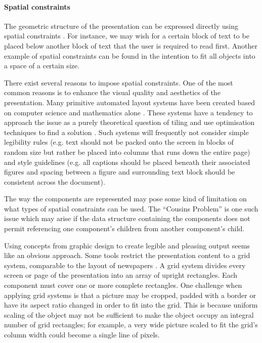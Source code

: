      \paragraph{Spatial constraints}
      \label{spatialcon}

      The geometric structure of the presentation can be expressed directly
      using spatial constraints . For instance, we may wish for a certain block
      of text to be placed below another block of text that the user is
      required to read first. Another example of spatial constraints can be
      found in the intention to fit all objects into a space of a certain size.

      There exist several reasons to impose spatial constraints. One of the
      most common reasons is to enhance the visual quality and aesthetics of
      the presentation. Many primitive automated layout systems have been
      created based on computer science and mathematics alone \citep{beach-1}.
      These systems have a tendency to approach the issue as a purely
      theoretical question of tiling and use optimisation techniques to find a
      solution \citep{luders-1}. Such systems will frequently not consider
      simple legibility rules (e.g. text should not be packed onto the screen
      in blocks of random size but rather be placed into columns that runs down
      the entire page) and style guidelines (e.g. all captions should be
      placed beneath their associated figures and spacing between a figure and
      surrounding text block should be consistent across the document).
     
      The way the components are represented may pose some kind of limitation
      on what types of spatial constraints can be used. The ``Cousins
      Problem'' is one such issue which may arise if the data structure
      containing the components does not permit referencing one component’s
      children from another component’s child.

      Using concepts from graphic design to create legible and pleasing output
      seems like an obvious approach. Some tools restrict the presentation
      content to a grid system, comparable to the layout of newspapers
      \citep{muller-1,hurlburt-1}. A grid system divides every screen or page
      of the presentation into an array of upright rectangles. Each component
      must cover one or more complete rectangles. One challenge when applying
      grid systems is that a picture may be cropped, padded with a border or
      have its aspect ratio changed in order to fit into the grid. This is
      because uniform scaling of the object may not be sufficient to make the
      object occupy an integral number of grid rectangles; for example, a very
      wide picture scaled to fit the grid's column width could become a single
      line of pixels.

